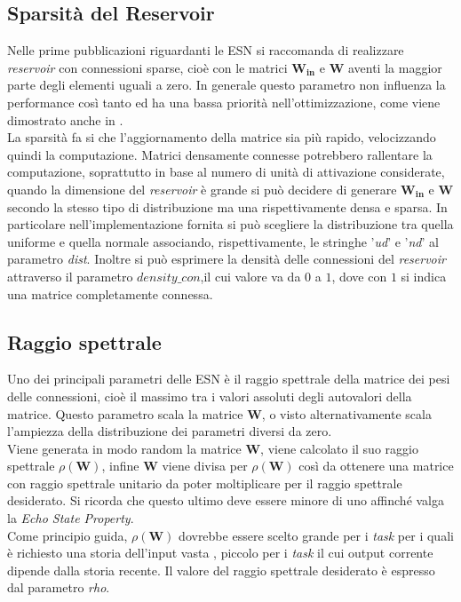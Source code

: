 \subsection{Sparsità del Reservoir}
Nelle prime pubblicazioni riguardanti le ESN si raccomanda di realizzare \textit{reservoir} con connessioni sparse, cioè con le matrici $\mathbf{W_{in}}$ e $\mathbf{W}$ aventi la maggior parte degli elementi uguali a zero.
In generale questo parametro non influenza la performance così tanto ed ha una bassa priorità nell'ottimizzazione, come viene dimostrato anche in \cite{Markovianfactor:paper}.\\
La sparsità fa si che l'aggiornamento della matrice sia più rapido, velocizzando quindi la computazione. Matrici densamente connesse potrebbero rallentare la computazione, soprattutto in base al numero di unità di attivazione considerate, quando la dimensione del \textit{reservoir} è grande si può decidere di generare $\mathbf{W_{in}}$ e $\mathbf{W}$ secondo la stesso tipo di distribuzione ma una rispettivamente densa e sparsa. In particolare nell'implementazione fornita si può scegliere la distribuzione tra quella uniforme e quella normale associando, rispettivamente, le stringhe '\textit{ud}' e '\textit{nd}' al parametro \textit{dist}. Inoltre si può esprimere la densità delle connessioni del \textit{reservoir} attraverso il parametro $\mathit{density\_con}$,il cui valore va da $0$ a $1$, dove con $1$ si indica una matrice completamente connessa. 

\subsection{Raggio spettrale}
Uno dei principali parametri delle ESN è il raggio spettrale della matrice dei pesi delle connessioni, cioè il massimo tra i valori assoluti degli autovalori della matrice. Questo parametro scala la matrice $\mathbf{W}$, o visto alternativamente scala l'ampiezza della distribuzione dei parametri diversi da zero.\\
Viene generata in modo random la matrice \textbf{W}, viene calcolato il suo raggio spettrale $\rho(\mathbf{W})$, infine \textbf{W} viene divisa per $\rho(\mathbf{W})$ così da ottenere una matrice con raggio spettrale unitario da poter moltiplicare per il raggio spettrale desiderato. Si ricorda che questo ultimo deve essere minore di uno affinché valga la \textit{Echo State Property}.\\
Come principio guida, $\rho(\mathbf{W})$ dovrebbe essere scelto grande per i \textit{task} per i quali è richiesto una storia dell'input vasta , piccolo per i \textit{task} il cui output corrente dipende dalla storia recente.
Il valore del raggio spettrale desiderato è espresso dal parametro \textit{rho}.

